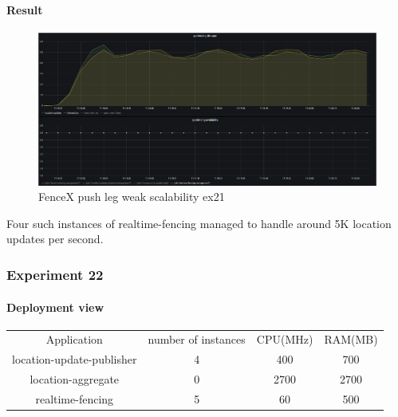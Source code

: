 \documentclass[a4]{report}
\begin{document}
    \paragraph{Result}
    \begin{figure}[ht]
        \caption{FenceX push leg weak scalability ex21}
        \label{fig:ex21}
        \includegraphics[scale=0.4]{images/evaluation/ex21-benchmarking-ongoing-1per6sec.png}
    \end{figure}
    Four such instances of realtime-fencing managed to handle around 5K location updates per second.


    \subsubsection{Experiment 22}
    \paragraph{Deployment view}
    \begin{center}
        \begin{tabular}{ c c c c }
            Application               &  number of instances     & CPU(MHz)  & RAM(MB)    \\
            location-update-publisher &          4               & 400       &   700      \\
            location-aggregate        &          0               & 2700      &   2700     \\
            realtime-fencing          &          5               & 60       &   500       \\
        \end{tabular}
    \end{center}
\end{document}
